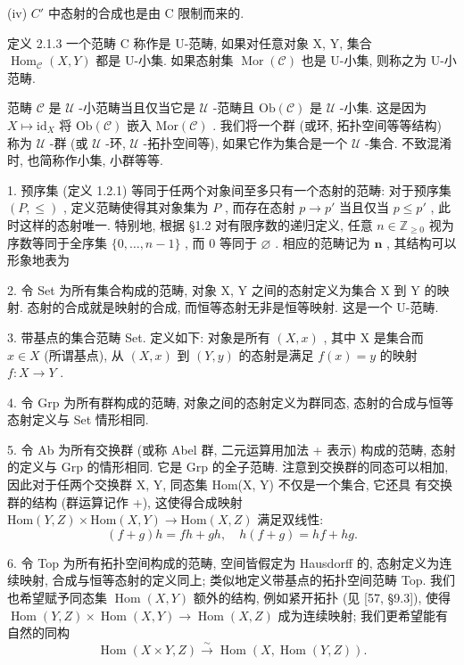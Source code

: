 \documentclass[]{article}
\begin{document}
(iv) $C'$ 中态射的合成也是由 C 限制而来的. 

定义 2.1.3 一个范畴 C 称作是 U-范畴, 如果对任意对象 X, Y, 集合 $\operatorname{Hom}_{\mathcal{C}}(X, Y)$ 都是 U-小集. 如果态射集 $\operatorname{Mor}(\mathcal{C})$ 也是 U-小集, 则称之为 U-小范畴. 

范畴 $\mathcal{C}$ 是 $\mathcal{U}$ -小范畴当且仅当它是 $\mathcal{U}$ -范畴且 $\mathrm{Ob}(\mathcal{C})$ 是 $\mathcal{U}$ -小集. 这是因为 $X \mapsto \mathrm{id}_X$ 将 $\mathrm{Ob}(\mathcal{C})$ 嵌入 $\mathrm{Mor}(\mathcal{C})$ . 我们将一个群 (或环, 拓扑空间等等结构) 称为 $\mathcal{U}$ -群 (或 $\mathcal{U}$ -环, $\mathcal{U}$ -拓扑空间等), 如果它作为集合是一个 $\mathcal{U}$ -集合. 不致混淆时, 也简称作小集, 小群等等. 

1. 预序集 (定义 1.2.1) 等同于任两个对象间至多只有一个态射的范畴: 对于预序集 $(P, \leq)$ , 定义范畴使得其对象集为 $P$ , 而存在态射 $p \to p'$ 当且仅当 $p \leq p'$ , 此时这样的态射唯一. 特别地, 根据 §1.2 对有限序数的递归定义, 任意 $n \in \mathbb{Z}_{\geq 0}$ 视为序数等同于全序集 $\{0, \ldots, n-1\}$ , 而 0 等同于 $\varnothing$ . 相应的范畴记为 $\mathbf{n}$ , 其结构可以形象地表为 

2. 令 Set 为所有集合构成的范畴, 对象 X, Y 之间的态射定义为集合 X 到 Y 的映射. 态射的合成就是映射的合成, 而恒等态射无非是恒等映射. 这是一个 U-范畴. 

3. 带基点的集合范畴 Set. 定义如下: 对象是所有 $(X, x)$ , 其中 X 是集合而 $x \in X$ (所谓基点), 从 $(X, x)$ 到 $(Y, y)$ 的态射是满足 $f(x) = y$ 的映射 $f : X \to Y$ . 

4. 令 Grp 为所有群构成的范畴, 对象之间的态射定义为群同态, 态射的合成与恒等态射定义与 Set 情形相同. 

5. 令 Ab 为所有交换群 (或称 Abel 群, 二元运算用加法 + 表示) 构成的范畴, 态射的定义与 Grp 的情形相同. 它是 Grp 的全子范畴. 注意到交换群的同态可以相加, 因此对于任两个交换群 X, Y, 同态集 Hom(X, Y) 不仅是一个集合, 它还具 有交换群的结构 (群运算记作 +), 这使得合成映射 $\mathrm{Hom}(Y,Z) \times \mathrm{Hom}(X,Y) \rightarrow \mathrm{Hom}(X,Z)$ 满足双线性:$$
(f + g) h = f h + g h, \quad h (f + g) = h f + h g.
$$

6. 令 Top 为所有拓扑空间构成的范畴, 空间皆假定为 Hausdorff 的, 态射定义为连续映射, 合成与恒等态射的定义同上; 类似地定义带基点的拓扑空间范畴 Top. 我们也希望赋予同态集 $\operatorname{Hom}(X,Y)$ 额外的结构, 例如紧开拓扑 (见 [57, §9.3]), 使得 $\operatorname{Hom}(Y,Z) \times \operatorname{Hom}(X,Y) \to \operatorname{Hom}(X,Z)$ 成为连续映射; 我们更希望能有自然的同构$$
\operatorname{Hom} (X \times Y, Z) \xrightarrow {\sim} \operatorname{Hom} (X, \operatorname{Hom} (Y, Z)).
$$
\end{document}
